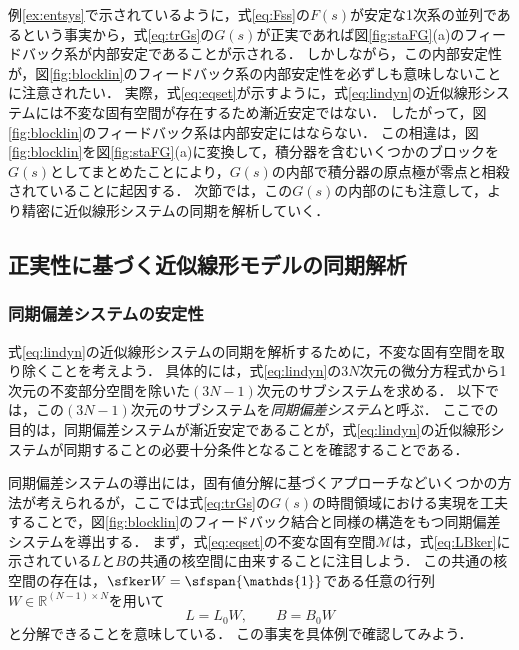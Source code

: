 \documentclass[a4j,10pt,oneside,openany,dvipdfmx]{jsbook}
\begin{document}
例\ref{ex:entsys}で示されているように，式\eqref{eq:Fss}の$F(s)$が安定な1次系の並列であるという事実から，式\eqref{eq:trGs}の$G(s)$が正実であれば図\ref{fig:staFG}(a)のフィードバック系が内部安定であることが示される．
しかしながら，この内部安定性が，図\ref{fig:blocklin}のフィードバック系の内部安定性を必ずしも意味しないことに注意されたい．
実際，式\eqref{eq:eqset}が示すように，式\eqref{eq:lindyn}の近似線形システムには不変な固有空間が存在するため漸近安定ではない．
したがって，図\ref{fig:blocklin}のフィードバック系は内部安定にはならない．
この相違は，図\ref{fig:blocklin}を図\ref{fig:staFG}(a)に変換して，積分器を含むいくつかのブロックを$G(s)$としてまとめたことにより，$G(s)$の内部で積分器の原点極が零点と相殺されていることに起因する．
次節では，この$G(s)$の内部のにも注意して，より精密に近似線形システムの同期を解析していく．

\subsection{正実性に基づく近似線形モデルの同期解析}\label{sec:syncanp}

\subsubsection{同期偏差システムの安定性}

式\eqref{eq:lindyn}の近似線形システムの同期を解析するために，不変な固有空間を取り除くことを考えよう．
具体的には，式\eqref{eq:lindyn}の$3N$次元の微分方程式から1次元の不変部分空間を除いた$(3N-1)$次元のサブシステムを求める．
以下では，この$(3N-1)$次元のサブシステムを\emph{同期偏差システム}と呼ぶ．
ここでの目的は，同期偏差システムが漸近安定であることが，式\eqref{eq:lindyn}の近似線形システムが同期することの必要十分条件となることを確認することである．


同期偏差システムの導出には，固有値分解に基づくアプローチなどいくつかの方法が考えられるが，ここでは式\eqref{eq:trGs}の$G(s)$の時間領域における実現を工夫することで，図\ref{fig:blocklin}のフィードバック結合と同様の構造をもつ同期偏差システムを導出する．
まず，式\eqref{eq:eqset}の不変な固有空間$\mathcal{M}$は，式\eqref{eq:LBker}に示されている$L$と$B$の共通の核空間に由来することに注目しよう．
この共通の核空間の存在は，$\sfker W = \sfspan\{ \mathds{1}\}$である任意の行列$W \in \mathbb{R}^{(N-1)\times N}$を用いて
\begin{equation}\label{eq:decLB}
L = L_0 W 
,\qquad
B = B_0 W 
\end{equation}
と分解できることを意味している．
この事実を具体例で確認してみよう．
\end{document}
